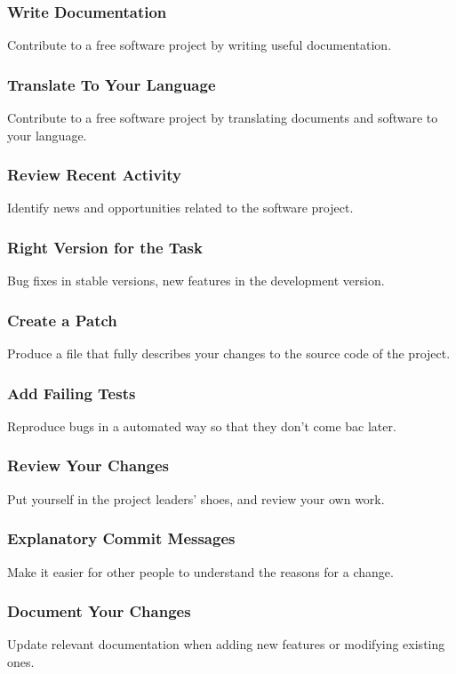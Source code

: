 \documentclass[12pt]{article}
\begin{document}
\subsubsection{Write Documentation} \label{contribution/WriteDocumentation}
    Contribute to a free software project by writing useful documentation.
\subsubsection{Translate To Your Language} \label{contribution/TranslateToYourLanguage}
     Contribute to a free software project by translating documents and software to your language.
\subsubsection{Review Recent Activity} \label{contribution/ReviewRecentActivity}
    Identify news and opportunities related to the software project.
\subsubsection{Right Version for the Task} \label{contribution/RightVersionForTheTask} 
    Bug fixes in stable versions, new features in the development version.
\subsubsection{Create a Patch} \label{contribution/CreatePatch}
    Produce a file that fully describes your changes to the source code of the project.
\subsubsection{Add Failing Tests} \label{contribution/AddTestsThatFail} 
    Reproduce bugs in a automated way so that they don't come bac   later.
\subsubsection{Review Your Changes}  \label{contribution/ReviewYourChanges}
    Put yourself in the project leaders' shoes, and review your own work.
\subsubsection{Explanatory Commit Messages} \label{contribution/ExplanatoryCommitMessages}
    Make it easier for other people to understand the reasons for a change.
\subsubsection{Document Your Changes} \label{contribution/DocumentYourChanges} 
    Update relevant documentation when adding new features or modifying existing ones.
\end{document}
